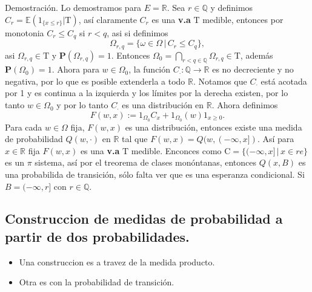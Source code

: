 \documentclass[letterpaper]{article}
\newcommand{\rac}{\ensuremath{ \mathbb Q }}
\newcommand{\prob}{\textbf{P}}
\newcommand{\esp}{\mathbb E}
\newcommand{\dem}{{\noindent \sc Demostraci\'on. }}
\newcommand{\om}{\ensuremath{\Omega}}
\newcommand{\re}{\ensuremath{\mathbb R }}
\begin{document}
\dem Lo demostramos para \(E=\re\). Sea \(r\in\rac\) y definimos \(C_r=\esp(1_{\{x\leq r\}} | \mathrm{T})\), así claramente \(C_r\) es una \textbf{v.a} \(\mathrm{T}\) medible, entonces por monotonia \(C_r\leq C_q\) si \(r<q\), asi si definimos
\[
    \om_{r,q}=\{\omega\in\om\,\vert\,C_{r}\leq C_q\},
\]
\noindent asi \(\om_{r,q}\in\mathrm{T}\) y \(\prob(\om_{r,q})=1\). Entonces \(\om_0=\bigcap_{r < q\in\rac}\om_{r,q}\in\mathrm{T}\), además \(\prob(\om_0)=1\). Ahora para \(w\in\om_0\), la función \(C_{\cdot}:\rac\rightarrow\re\) es no decreciente y no negativa, por lo que es posible extenderla a todo \(\re\). Notamos que \(C_{\cdot}\) está acotada por 1 y es continua a la izquierda y los límites por la derecha existen, por lo tanto \(w\in\om_0\) y por lo tanto \(C_{\cdot}\) es una distribución en \(\re\). Ahora definimos
\[
    F(w,x):=1_{\om_0}C_x+1_{\om_0}(w)1_{x\geq0}.
\]
Para cada \(w\in\om\) fija, \(F(w,x)\) es una distribución, entonces existe una medida de probabilidad \(Q(w,\cdot)\) en \(\re\) tal que \(F(w,x)=Q(w,(-\infty,x])\). Así para \(x\in\re\) fija \(F(w,x)\) es una \textbf{v.a} \(\mathrm{T}\) medible. Enconces como \(\mathrm{C}=\{(-\infty,x]\,\vert\,x\in re\}\) es un \(\pi\) sistema, así por el treorema de clases monóntanas, entonces \(Q(x,B)\) es una probabilida de transición, sólo falta ver que es una esperanza condicional. Si \(B=(-\infty,r]\) con \(r\in\rac\).

\subsection{Construccion de medidas de probabilidad a partir de dos probabilidades.}
\label{sec:orgb60366b}
\begin{itemize}
\item Una construccion es a travez de la medida producto.
\item Otra es con la probabilidad de transición.
\end{itemize}
\end{document}
